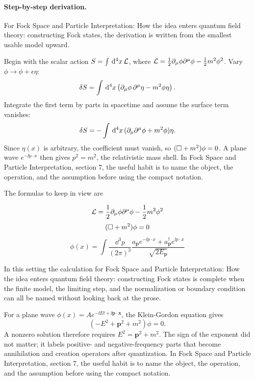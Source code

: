 \paragraph{Step-by-step derivation.}

For Fock Space and Particle Interpretation: How the idea enters quantum field theory: constructing Fock states, the derivation is written from the smallest usable model upward.

Begin with the scalar action \(S=\int\,\mathrm d^4x\,\mathcal L\), where \(\mathcal L=\frac12\partial_\mu\phi\partial^\mu\phi-\frac12m^2\phi^2\).  Vary \(\phi\to\phi+\epsilon\eta\):
\[
  \delta S=\int\,\mathrm d^4x\left(\partial_\mu\phi\,\partial^\mu\eta-m^2\phi\eta\right).
\]
Integrate the first term by parts in spacetime and assume the surface term vanishes:
\[
  \delta S=-\int\,\mathrm d^4x\,(\partial_\mu\partial^\mu\phi+m^2\phi)\eta.
\]
Since \(\eta(x)\) is arbitrary, the coefficient must vanish, so \((\Box+m^2)\phi=0\).  A plane wave \(e^{-\ii p\cdot x}\) then gives \(p^2=m^2\), the relativistic mass shell.  In Fock Space and Particle Interpretation, section 7, the useful habit is to name the object, the operation, and the assumption before using the compact notation.

The formulas to keep in view are

\[
  \mathcal L=\frac12\partial_\mu\phi\partial^\mu\phi-\frac12m^2\phi^2
\]
\[
  (\Box+m^2)\phi=0
\]
\[
  \phi(x)=\int\frac{\dd^3p}{(2\pi)^3}\frac{a_{\bm p}e^{-\ii p\cdot x}+a_{\bm p}^\dagger e^{\ii p\cdot x}}{\sqrt{2E_{\bm p}}}
\]

In this setting the calculation for Fock Space and Particle Interpretation: How the idea enters quantum field theory: constructing Fock states is complete when the finite model, the limiting step, and the normalization or boundary condition can all be named without looking back at the prose.




\begin{example}
For a plane wave \(\phi(x)=Ae^{-\ii Et+\ii\bm p\cdot\bm x}\), the Klein-Gordon equation gives
\[
  (-E^2+\bm p^2+m^2)\phi=0.
\]
A nonzero solution therefore requires \(E^2=\bm p^2+m^2\).  The sign of the exponent did not matter; it labels positive- and negative-frequency parts that become annihilation and creation operators after quantization.  In Fock Space and Particle Interpretation, section 7, the useful habit is to name the object, the operation, and the assumption before using the compact notation.
\end{example}



